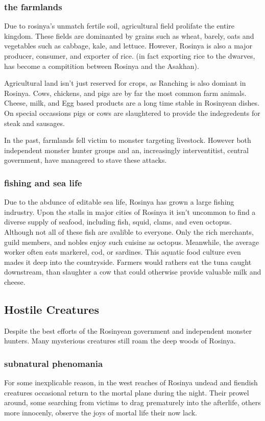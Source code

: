 \documentclass[../main.tex]{subfiles}
\begin{document}
\subsubsection{the farmlands}
Due to rosinya's unmatch fertile soil, agricultural field prolifate the entire 
kingdom. These fields are dominanted by grains such as wheat, barely, oats and vegetables
such as cabbage, kale, and lettuce. However, Rosinya is also a major producer, 
consumer, and exporter of rice. 
(in fact exporting rice to the dwarves, has become a compitition between Rosinya and the Asakhan).

Agricultural land isn't just reserved for crops, as Ranching is also domiant in Rosinya.
Cows, chickens, and pigs are by far the most common farm animals. Cheese, milk, and Egg
based products are a long time stable in Rosinyean dishes. On special occassions pigs or
cows are slaughtered to provide the indegredents for steak and sausages.

In the past, farmlands fell victim to monster targeting livestock. However both independent 
monster hunter groups and an, increasingly interventitist, central government, have managered 
to stave these attacks.

\subsubsection{fishing and sea life}
Due to the abdunce of editable sea life, Rosinya has grown a large fishing indrustry.
Upon the stalls in major cities of Rosinya it isn't uncommon to find a diverse 
supply of seafood, including fish, squid, clams, and even octopus. Although not all
of these fish are avalible to everyone. Only the rich merchants, guild members, and nobles
enjoy such cuisine as octopus. Meanwhile, the average worker often eats markerel, cod, 
or sardines. This aquatic food culture even mades it deep into the countryside. Farmers would 
rathers eat the tuna caught downstream, than slaughter a cow that could otherwise 
provide valuable milk and cheese.

\subsection{Hostile Creatures}
Despite the best efforts of the Rosinyean government and independent monster hunters.
Many mysterious creatures still roam the deep woods of Rosinya.   

\subsubsection{subnatural phenomania}
For some inexplicable reason, in the west reaches of Rosinya undead and fiendish 
creatures occasional return to the mortal plane during the night. Their prowel around, 
some searching from victims to drag prematurely into the afterlife, others more 
innocenly, observe the joys of mortal life their now lack. 
\end{document}
